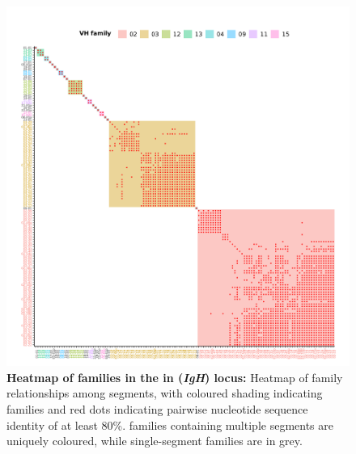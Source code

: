 	\begin{figure}
	\centering
	\includegraphics[width=\textwidth]{_Figures/png/xma-vh-families-map}
	\caption[Heatmap of \vh families in the in \Xma \textit{IgH} locus]{\textbf{Heatmap of \vh families in the in \Xma (\textit{IgH}) locus:} Heatmap of family relationships among \Xma \vh segments, with coloured shading indicating families and red dots indicating pairwise nucleotide sequence identity of at least 80\%. \vh families containing multiple segments are uniquely coloured, while single-segment families are in grey.}
	\label{fig:xma-vh-families-map}
	\end{figure}
	
